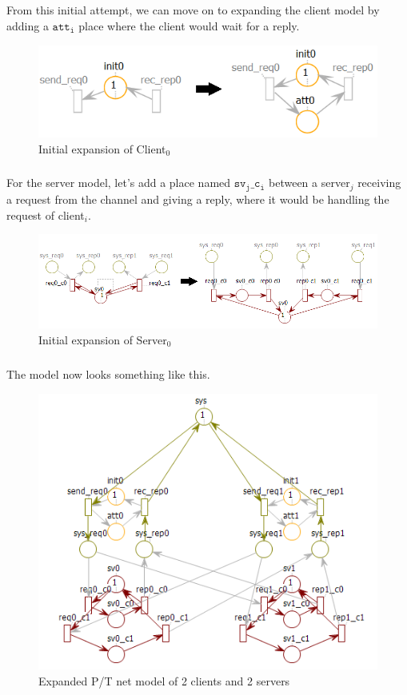 \documentclass{article}
\begin{document}
	\subparagraph{}From this initial attempt, we can move on to expanding the client model by adding a $\mathtt{att_i}$ place where the client would wait for a reply.
	\begin{figure}[h]
		\centering
		\vspace*{10pt}
		\includegraphics[scale=0.7]{client}
		\caption{Initial expansion of Client$_0$}
	\end{figure}
	\subparagraph{}For the server model, let's add a place named $\mathtt{sv_j\_c_i}$ between a server$_j$ receiving a request from the channel and giving a reply, where it would be handling the request of client$_i$. 
	\begin{figure}[h]
		\centering
		\hspace*{-50pt}
		\vspace*{10pt}
		\includegraphics[scale=0.8]{server}
		\caption{Initial expansion of Server$_0$}
	\end{figure}
	\newpage
	\subparagraph{}The model now looks something like this.
	\begin{figure}[h]
		\centering
		\includegraphics[scale=0.8]{cli2sv2_abs1}
		\caption{Expanded P/T net model of 2 clients and 2 servers}
	\end{figure}
\end{document}
